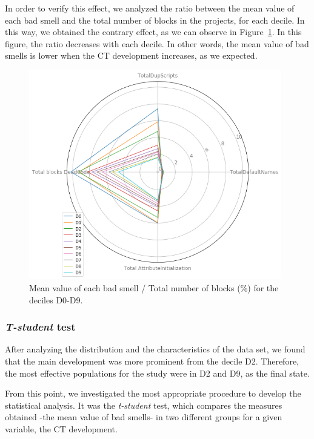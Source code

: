 In order to verify this effect, we analyzed the ratio between the mean value of each bad smell and the total number of blocks in the projects, for each decile. In this way, we obtained the contrary effect, as we can observe in Figure~\ref{fig:ratio_bad_smells_deciles}. In this figure, the ratio decreases with each decile. In other words, the mean value of bad smells is lower when the CT development increases, as we expected. 

\begin{figure}
    \centering
    \includegraphics[width=11cm,                         keepaspectratio]{img/ratio_bad_smells_deciles.png}
    \caption{Mean value of each bad smell / Total number of blocks (\%) for the deciles D0-D9.}
    \label{fig:ratio_bad_smells_deciles}
\end{figure}

\subsubsection{\textit{T-student} test}
\label{subsubsec:test_tstudent}

After analyzing the distribution and the characteristics of the data set, we found that the main development was more prominent from the decile D2. Therefore, the most effective populations for the study were in D2 and D9, as the final state. 

From this point, we investigated the most appropriate procedure to develop the statistical analysis. It was the \textit{t-student} test, which compares the measures obtained -the mean value of bad smells- in two different groups for a given variable, the CT development.


